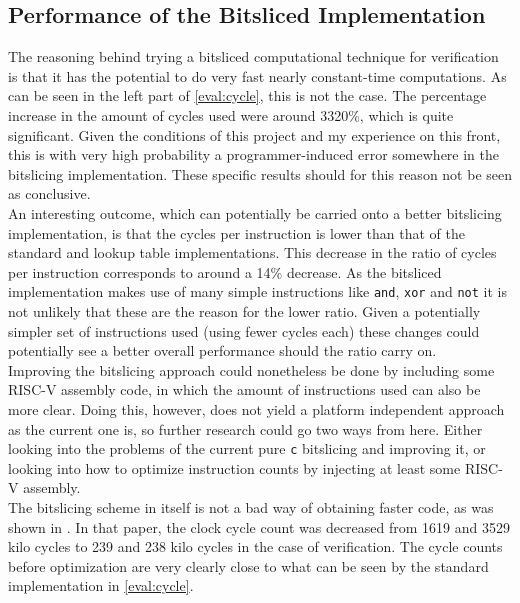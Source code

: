 \subsection{Performance of the Bitsliced Implementation}
The reasoning behind trying a bitsliced computational technique for verification is that it has the potential to do very fast nearly constant-time computations. As can be seen in the left part of \cref{eval:cycle}, this is not the case. The percentage increase in the amount of cycles used were around 3320\%, which is quite significant. Given the conditions of this project and my experience on this front, this is with very high probability a programmer-induced error somewhere in the bitslicing implementation. These specific results should for this reason not be seen as conclusive.
\medskip\\
An interesting outcome, which can potentially be carried onto a better bitslicing implementation, is that the cycles per instruction is lower than that of the standard and lookup table implementations. This decrease in the ratio of cycles per instruction corresponds to around a 14\% decrease. As the bitsliced implementation makes use of many simple instructions like \texttt{and}, \texttt{xor} and \texttt{not} it is not unlikely that these are the reason for the lower ratio. Given a potentially simpler set of instructions used (using fewer cycles each) these changes could potentially see a better overall performance should the ratio carry on.
\medskip\\
Improving the bitslicing approach could nonetheless be done by including some RISC-V assembly code, in which the amount of instructions used can also be more clear. Doing this, however, does not yield a platform independent approach as the current one is, so further research could go two ways from here. Either looking into the problems of the current pure \texttt{c} bitslicing and improving it, or looking into how to optimize instruction counts by injecting at least some RISC-V assembly.
\medskip\\
The bitslicing scheme in itself is not a bad way of obtaining faster code, as was shown in \cite{betterbitslicer}. In that paper, the clock cycle count was decreased from 1619 and 3529 kilo cycles to 239 and 238 kilo cycles in the case of verification. The cycle counts before optimization are very clearly close to what can be seen by the standard implementation in \cref{eval:cycle}.